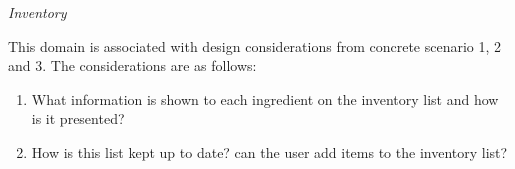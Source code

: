 \emph{Inventory}

This domain is associated with design considerations from concrete scenario 1, 2 and 3. The considerations are as follows:

\begin{enumerate}
	\item What information is shown to each ingredient on the inventory list and how is it presented? 
	\item How is this list kept up to date? can the user add items to the inventory list?
\end{enumerate}
